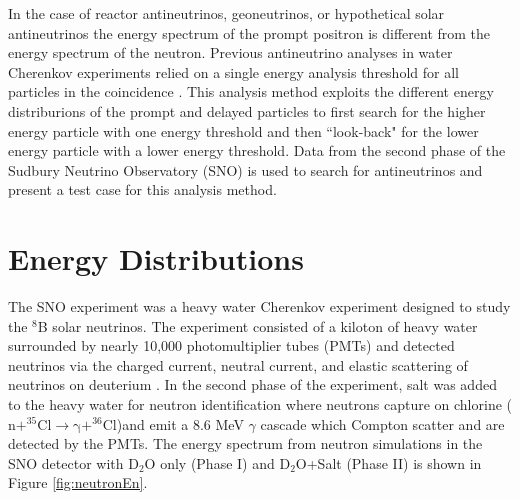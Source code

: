 \documentclass[preprint,12pt]{elsarticle}
\begin{document}
In the case of reactor antineutrinos, geoneutrinos, or hypothetical solar antineutrinos the energy spectrum of the prompt positron is different from the energy spectrum of the neutron. Previous antineutrino analyses in water Cherenkov experiments relied on a single energy analysis threshold for all particles in the coincidence \cite{snoantinu} \cite{skSolar}.  This analysis method exploits the different energy distriburions of the prompt and delayed particles to first search for the higher energy particle with one energy threshold and then ``look-back" for the lower energy particle with a lower energy threshold. Data from the second phase of the Sudbury Neutrino Observatory (SNO) is used to search for antineutrinos and present a test case for this analysis method. 

\section{Energy Distributions}
\label{sec:en}
The SNO experiment was a heavy water Cherenkov experiment designed to study the $^{8}$B solar neutrinos.  The experiment consisted of a kiloton of heavy water surrounded by nearly 10,000 photomultiplier tubes (PMTs) and detected neutrinos via the charged current, neutral current, and elastic scattering of neutrinos on deuterium \cite{snoNIM}. In the second phase of the experiment, salt was added to the heavy water for neutron identification where neutrons capture on chlorine ($\mathrm{n+^{35}Cl\rightarrow \gamma +^{36}Cl}$)and emit a 8.6 MeV $\gamma$ cascade which Compton scatter and are detected by the PMTs. The energy spectrum from neutron simulations in the SNO detector with D$_2$O only (Phase I) and D$_2$O+Salt (Phase II) is shown in Figure \ref{fig:neutronEn}.
\end{document}
